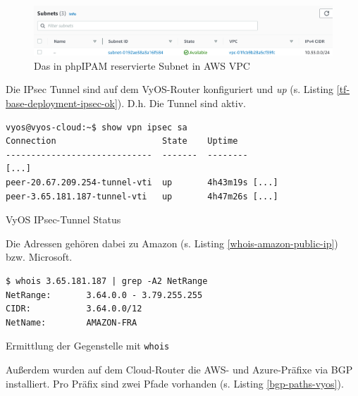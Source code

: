 \begin{figure}[h]
  \centering
  \includegraphics[scale=0.4]{Figures/subnet_aws_reserved_server.png}
  \caption{Das in phpIPAM reservierte Subnet in AWS VPC}
  \label{grafik:subnet_aws_vpc_reserved}
\end{figure}\FloatBarrier
\newpage
Die IPsec Tunnel sind auf dem VyOS-Router konfiguriert und \textit{up} (s. Listing \ref{tf-base-deployment-ipsec-ok}). D.h. Die Tunnel sind aktiv.
\begin{listing}[h]
\begin{verbatim}
vyos@vyos-cloud:~$ show vpn ipsec sa
Connection                     State    Uptime
-----------------------------  -------  --------
[...]
peer-20.67.209.254-tunnel-vti  up       4h43m19s [...]
peer-3.65.181.187-tunnel-vti   up       4h47m26s [...]

\end{verbatim}
\caption{VyOS IPsec-Tunnel Status}
\label{tf-base-deployment-ipsec-ok}
\end{listing}\FloatBarrier
Die Adressen gehören dabei zu Amazon (s. Listing \ref{whois-amazon-public-ip}) bzw. Microsoft.
\begin{listing}[h]
\begin{verbatim}
$ whois 3.65.181.187 | grep -A2 NetRange
NetRange:       3.64.0.0 - 3.79.255.255
CIDR:           3.64.0.0/12
NetName:        AMAZON-FRA

\end{verbatim}
\caption{Ermittlung der Gegenstelle mit \texttt{whois}}
\label{whois-amazon-public-ip}
\end{listing}\FloatBarrier
Außerdem wurden auf dem Cloud-Router die AWS- und Azure-Präfixe via BGP installiert. Pro Präfix sind zwei Pfade vorhanden (s. Listing \ref{bgp-paths-vyos}).

